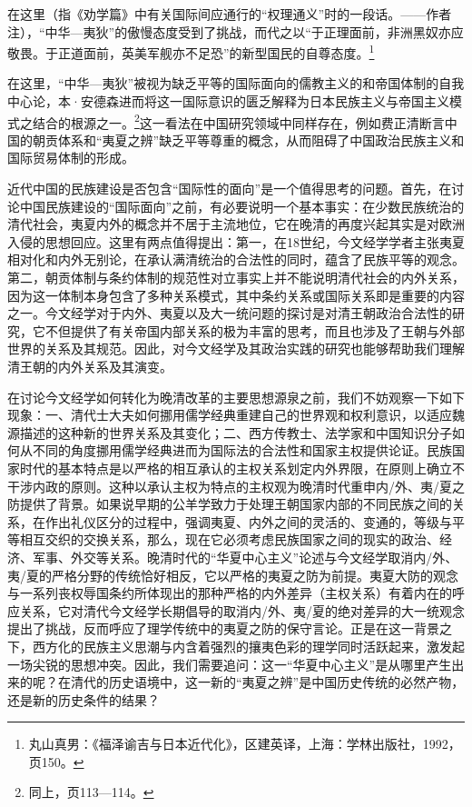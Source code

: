\documentclass[a4paper, 12pt, openright]{ctexbook}
\renewenvironment{quote}
  {\list{}{\rightmargin2\ccwd \leftmargin2\ccwd \itemindent=2\ccwd \listparindent=2\ccwd}%
   \item\relax\small\kaishu\color{black}}
  {\endlist}
\begin{document}
\begin{quote}
在这里（指《劝学篇》中有关国际间应通行的“权理通义”时的一段话。——作者注），“中华—夷狄”的傲慢态度受到了挑战，而代之以“于正理面前，非洲黑奴亦应敬畏。于正道面前，英美军舰亦不足恐”的新型国民的自尊态度。\footnote{丸山真男：《福泽谕吉与日本近代化》，区建英译，上海：学林出版社，1992，页150。}
\end{quote}

在这里，“中华—夷狄”被视为缺乏平等的国际面向的儒教主义的和帝国体制的自我中心论，本·安德森进而将这一国际意识的匮乏解释为日本民族主义与帝国主义模式之结合的根源之一。\footnote{同上，页113—114。}这一看法在中国研究领域中同样存在，例如费正清断言中国的朝贡体系和“夷夏之辨”缺乏平等尊重的概念，从而阻碍了中国政治民族主义和国际贸易体制的形成。

近代中国的民族建设是否包含“国际性的面向”是一个值得思考的问题。首先，在讨论中国民族建设的“国际面向”之前，有必要说明一个基本事实：在少数民族统治的清代社会，夷夏内外的概念并不居于主流地位，它在晚清的再度兴起其实是对欧洲入侵的思想回应。这里有两点值得提出：第一，在18世纪，今文经学学者主张夷夏相对化和内外无别论，在承认满清统治的合法性的同时，蕴含了民族平等的观念。第二，朝贡体制与条约体制的规范性对立事实上并不能说明清代社会的内外关系，因为这一体制本身包含了多种关系模式，其中条约关系或国际关系即是重要的内容之一。今文经学对于内外、夷夏以及大一统问题的探讨是对清王朝政治合法性的研究，它不但提供了有关帝国内部关系的极为丰富的思考，而且也涉及了王朝与外部世界的关系及其规范。因此，对今文经学及其政治实践的研究也能够帮助我们理解清王朝的内外关系及其演变。

在讨论今文经学如何转化为晚清改革的主要思想源泉之前，我们不妨观察一下如下现象：一、清代士大夫如何挪用儒学经典重建自己的世界观和权利意识，以适应魏源描述的这种新的世界关系及其变化；二、西方传教士、法学家和中国知识分子如何从不同的角度挪用儒学经典进而为国际法的合法性和国家主权提供论证。民族国家时代的基本特点是以严格的相互承认的主权关系划定内外界限，在原则上确立不干涉内政的原则。这种以承认主权为特点的主权观为晚清时代重申内/外、夷/夏之防提供了背景。如果说早期的公羊学致力于处理王朝国家内部的不同民族之间的关系，在作出礼仪区分的过程中，强调夷夏、内外之间的灵活的、变通的，等级与平等相互交织的交换关系，那么，现在它必须考虑民族国家之间的现实的政治、经济、军事、外交等关系。晚清时代的“华夏中心主义”论述与今文经学取消内/外、夷/夏的严格分野的传统恰好相反，它以严格的夷夏之防为前提。夷夏大防的观念与一系列丧权辱国条约所体现出的那种严格的内外差异（主权关系）有着内在的呼应关系，它对清代今文经学长期倡导的取消内/外、夷/夏的绝对差异的大一统观念提出了挑战，反而呼应了理学传统中的夷夏之防的保守言论。正是在这一背景之下，西方化的民族主义思潮与内含着强烈的攘夷色彩的理学同时活跃起来，激发起一场尖锐的思想冲突。因此，我们需要追问：这一“华夏中心主义”是从哪里产生出来的呢？在清代的历史语境中，这一新的“夷夏之辨”是中国历史传统的必然产物，还是新的历史条件的结果？
\end{document}
